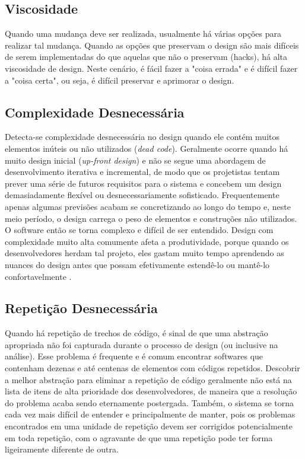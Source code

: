 \subsection{Viscosidade}

Quando uma mudança deve ser realizada, usualmente há várias opções para realizar tal mudança. Quando as opções que preservam o design são mais difíceis de serem implementadas do que aquelas que não o preservam (hacks), há alta viscosidade de design. Neste cenário, é fácil fazer a "coisa errada" e é difícil fazer a "coisa certa", ou seja, é difícil preservar e aprimorar o design.

\subsection{Complexidade Desnecessária}

Detecta-se complexidade desnecessária no design quando ele contém muitos elementos inúteis ou não utilizados (\textit{dead code}). Geralmente ocorre quando há muito design inicial (\textit{up-front design}) e não se segue uma abordagem de desenvolvimento iterativa e incremental, de modo que os projetistas tentam prever uma série de futuros requisitos para o sistema e concebem um design demasiadamente flexível ou desnecessariamente sofisticado. Frequentemente apenas algumas previsões acabam se concretizando ao longo do tempo e, neste meio período, o design carrega o peso de elementos e construções não utilizados. O software então se torna complexo e difícil de ser entendido. Design com complexidade muito alta comumente afeta a produtividade, porque quando os desenvolvedores herdam tal projeto, eles gastam muito tempo aprendendo as nuances do design antes que possam efetivamente estendê-lo ou mantê-lo confortavelmente \cite{kerievsky}.

\subsection{Repetição Desnecessária}

Quando há repetição de trechos de código, é sinal de que uma abstração apropriada não foi capturada durante o processo de design (ou inclusive na análise).
Esse problema é frequente e é comum encontrar softwares que contenham dezenas e até centenas de elementos com códigos repetidos. Descobrir a melhor abstração para eliminar a repetição de código geralmente não está na lista de itens de alta prioridade dos desenvolvedores, de maneira que a resolução do problema acaba sendo eternamente postergada. Também, o sistema se torna cada vez mais difícil de entender e principalmente de manter, pois os problemas encontrados em uma unidade de repetição devem ser corrigidos potencialmente em toda repetição, com o agravante de que uma repetição pode ter forma ligeiramente diferente de outra.

